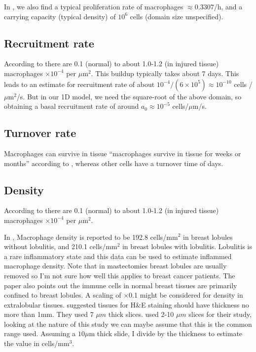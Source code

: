 \documentclass{article}
\begin{document}
         In \cite{khajanchi2021spatiotemporal}, we also find a typical proliferation rate of macrophages $\approx 0.3307$/h, and a carrying capacity (typical density) of  $10^6$ cells (domain size unspecified).

    \subsection{Recruitment rate}
        According to \cite{gupta2006spatiotemporal} there are 0.1 (normal) to about 1.0-1.2 (in injured tissue)  macrophages $\times 10^{-4}$ per $\mu$m$^2$. This buildup typically takes about 7 days. This leads to an estimate for recruitment rate of about $10^{-4}/(6\times 10^5) \approx 10^{-10}$ cells /$\mu$m$^2$/s. But in our 1D model, we need the square-root of the above domain, so obtaining a basal recruitment rate of around $a_0\approx 10^{-5}$ cells/$\mu$m/s.

    \subsection{Turnover rate}
        Macrophages can survive in tissue ``macrophages survive in tissue for weeks or months'' according to \cite{owen1997pattern}, whereas other cells have a turnover time of days.

    \subsection{Density}
        According to \cite{gupta2006spatiotemporal} there are 0.1 (normal) to about 1.0-1.2 (in injured tissue)  macrophages $\times 10^{-4}$ per $\mu$m$^2$. 

        In \cite{degnim2014immune}, Macrophage density is reported to be 192.8 cells/mm$^2$ in breast lobules without lobulitis, and 210.1 cells/mm$^2$ in breast lobules with lobulitis. Lobulitis is a rare inflammatory state and this data can be used to estimate inflammed macrophage density. Note that in mastectomies breast lobules are usually removed so I'm not sure how well this applies to breast cancer patients. The paper also points out the immune cells in normal breast tissues are primarily confined to breast lobules. A scaling of $\times$0.1 might be considered for density in extralobular tissues. \cite{li2018hematoxylin} suggested tissues for H\&E staining should have thickness no more than 1mm. They used 7 $\mu m$ thick slices. \cite{chlipala2020optical} used 2-10 $\mu m$ slices for their study, looking at the nature of this study we can maybe assume that this is the common range used. Assuming a $10\mu$m thick slide, I divide by the thickness to estimate the value in cells/mm$^3$. 
\end{document}
